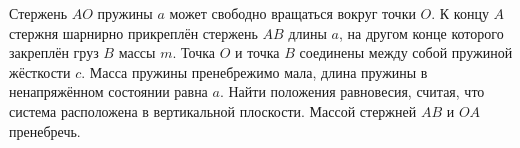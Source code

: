 Стержень $AO$ пружины $a$ может свободно вращаться вокруг точки $O$.
К концу $A$ стержня шарнирно прикреплён стержень $AB$ длины $a$,
на другом конце которого закреплён груз $B$ массы $m$.
Точка $O$ и точка $B$ соединены между собой пружиной жёсткости $c$.
Масса пружины пренебрежимо мала,
длина пружины в ненапряжённом состоянии равна $a$.
Найти положения равновесия, считая,
что система расположена в вертикальной плоскости.
Массой стержней $AB$ и $OA$ пренебречь.
